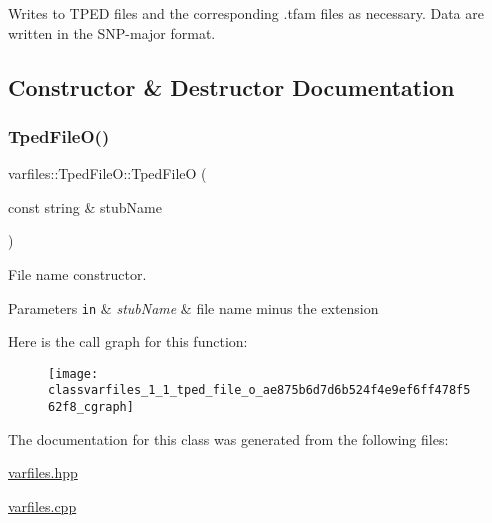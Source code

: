 Writes to T\+P\+ED files and the corresponding .tfam files as necessary. Data are written in the S\+N\+P-\/major format. 

\subsection{Constructor \& Destructor Documentation}
\mbox{\label{classvarfiles_1_1_tped_file_o_ae875b6d7d6b524f4e9ef6ff478f562f8}} 
\subsubsection{\texorpdfstring{Tped\+File\+O()}{TpedFileO()}}
{\footnotesize\ttfamily varfiles\+::\+Tped\+File\+O\+::\+Tped\+FileO (\begin{DoxyParamCaption}\item[{const string \&}]{stub\+Name }\end{DoxyParamCaption})\hspace{0.3cm}{\ttfamily [inline]}}



File name constructor. 


\begin{DoxyParams}[1]{Parameters}
\mbox{\tt in}  & {\em stub\+Name} & file name minus the extension \\
\hline
\end{DoxyParams}
Here is the call graph for this function\+:\nopagebreak
\begin{figure}[H]
\begin{center}
\leavevmode
\texttt{[image: classvarfiles\_1\_1\_tped\_file\_o\_ae875b6d7d6b524f4e9ef6ff478f562f8\_cgraph]}
\end{center}
\end{figure}


The documentation for this class was generated from the following files\+:\begin{DoxyCompactItemize}
\item 
\hyperlink{varfiles_8hpp}{varfiles.\+hpp}\item 
\hyperlink{varfiles_8cpp}{varfiles.\+cpp}\end{DoxyCompactItemize}
